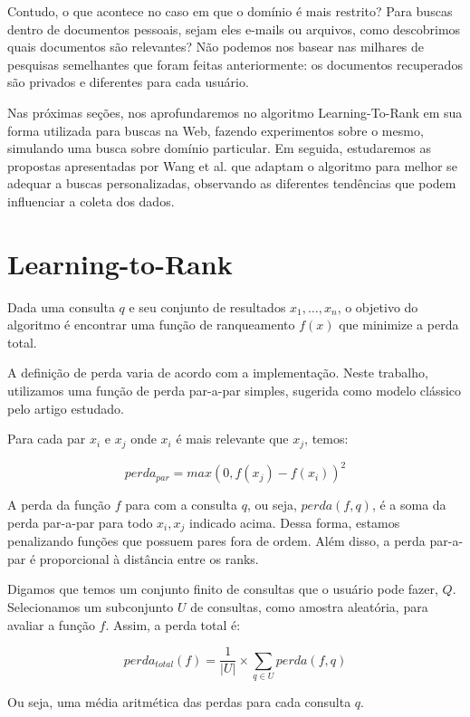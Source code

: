 \documentclass{svproc}
\begin{document}
Contudo, o que acontece no caso em que o domínio é mais restrito? Para buscas dentro de documentos pessoais, sejam eles
e-mails ou arquivos, como descobrimos quais documentos são relevantes? Não podemos nos basear nas milhares de pesquisas
semelhantes que foram feitas anteriormente: os documentos recuperados são privados e diferentes para cada usuário.

Nas próximas seções, nos aprofundaremos no algoritmo Learning-To-Rank em sua forma utilizada para buscas na Web, fazendo 
experimentos sobre o mesmo, simulando uma busca sobre domínio particular. Em seguida, estudaremos as propostas apresentadas 
por Wang et al. \cite{wang:bendersky:metzlet:najork} que adaptam o algoritmo para melhor se adequar a buscas personalizadas,
observando as diferentes tendências que podem influenciar a coleta dos dados.


\section{Learning-to-Rank}
Dada uma consulta $q$ e seu conjunto de resultados ${x_1,\dots,x_n}$, o objetivo do algoritmo
é encontrar uma função de ranqueamento $f(x)$ que minimize a perda total.

A definição de perda varia de acordo com a implementação. Neste trabalho, utilizamos uma função de perda par-a-par
simples, sugerida como modelo clássico pelo artigo estudado.

Para cada par $x_i$ e $x_j$ onde $x_i$ é mais relevante que $x_j$, temos:

\begin{equation}
perda_{par} = max(0, f(x_j) - f(x_i))^2
\end{equation}

A perda da função $f$ para com a consulta $q$, ou seja, $perda(f, q)$, é a soma da perda par-a-par para todo 
$x_i, x_j$ indicado acima. Dessa forma, estamos penalizando funções que possuem pares fora de ordem.
Além disso, a perda par-a-par é proporcional à distância entre os ranks.

Digamos que temos um conjunto finito de consultas que o usuário pode fazer, $Q$. 
Selecionamos um subconjunto $U$ de consultas, como amostra aleatória, para avaliar a função $f$.
Assim, a perda total é:

\begin{equation}
perda_{total}(f) = \frac{1}{|U|}\times \sum_{q \in U} perda(f, q)
\end{equation}

Ou seja, uma média aritmética das perdas para cada consulta $q$.
\end{document}
